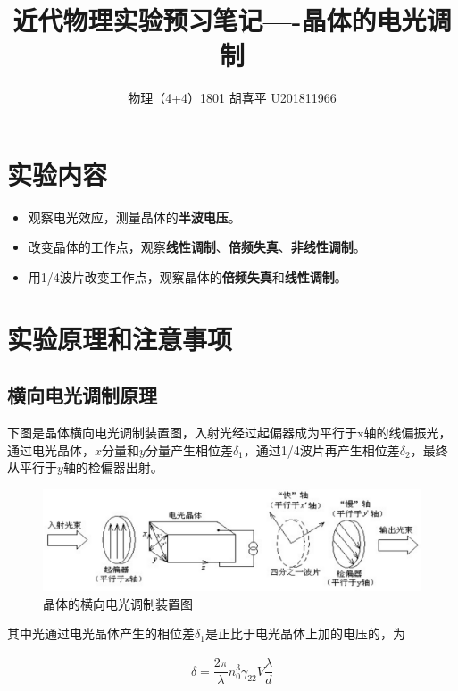 \documentclass{article}
\author{物理（4+4）1801 \quad  胡喜平 \quad U201811966}
\affil{个人网站 https://hxp.plus/ \quad 电子邮件 hxp201406@gmail.com}
\title{近代物理实验预习笔记—-晶体的电光调制}
\begin{document}
\maketitle\thispagestyle{fancy}

\section{实验内容}

\begin{itemize}
\item 观察电光效应，测量晶体的\textbf{半波电压}。
\item 改变晶体的工作点，观察\textbf{线性调制}、\textbf{倍频失真}、\textbf{非线性调制}。
\item 用1/4波片改变工作点，观察晶体的\textbf{倍频失真}和\textbf{线性调制}。
\end{itemize}

\section{实验原理和注意事项}

\subsection{横向电光调制原理}

下图是晶体横向电光调制装置图，入射光经过起偏器成为平行于x轴的线偏振光，通过电光晶体，$x$分量和$y$分量产生相位差$\delta_1$，通过1/4波片再产生相位差$\delta_2$，最终从平行于$y$轴的检偏器出射。

\begin{figure}[H]
  \centering
  \includegraphics[width=0.9\linewidth]{figures/晶体的横向电光调制}
  \caption{晶体的横向电光调制装置图}
\end{figure}

其中光通过电光晶体产生的相位差$\delta_1$是正比于电光晶体上加的电压的，为

\begin{equation*}
  \begin{aligned}
    \delta = \dfrac{2 \pi}{\lambda} n_0^3 \gamma_{22} V \dfrac{\lambda}{d}  
  \end{aligned}
\end{equation*}
\end{document}
